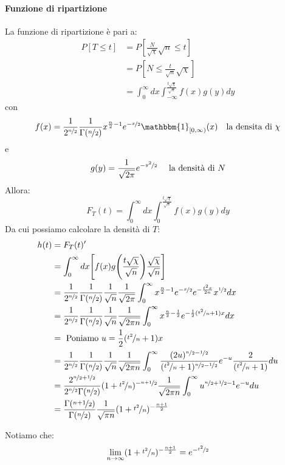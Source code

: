 \documentclass[12pt]{report}
\begin{document}
	 \paragraph{Funzione di ripartizione}
	 La funzione di ripartizione è pari a:
	 \begin{align*}
	 	P[T \leq t] &= P[\frac{N}{\sqrt{\chi}}\sqrt{n} \leq t] \\
	 	&= P[N \leq \frac{t}{\sqrt{n}}\sqrt{\chi}] \\
	 	&= \int_{0}^{\infty}dx\int_{-\infty}^{\frac{t\sqrt{\chi}}{\sqrt{n}}}f(x)g(y)dy
	 \end{align*}
	 con
	 \[
	 f(x) = \frac{1}{2^{\nicefrac{n}{2}}}\frac{1}{\Gamma(\nicefrac{n}{2})}x^{\frac{n}{2} - 1}e^{-\nicefrac{x}{2}}\mathbbm{1}_{[0, \infty)}(x) \quad \text{la densita di }\chi
	 \]
	 e
	 \[
	 g(y) = \frac{1}{\sqrt{2\pi}}e^{-\nicefrac{y^2}{2}} \quad \text{ la densità di }N
	 \]
	 Allora:
	\[
	F_T(t) = \int_{0}^{\infty}dx\int_{0}^{\frac{t\sqrt{\chi}}{\sqrt{n}}}f(x)g(y)dy
	\]
	Da cui possiamo calcolare la densità di $T$:
	\begin{align*}
		h(t) &= F_T(t)' \\
		&= \int_{0}^{\infty}dx\Bigg[f(x)g\Bigg(\frac{t\sqrt{\chi}}{\sqrt{n}}\Bigg)\frac{\sqrt{\chi}}{\sqrt{n}}\Bigg] \\
		&=\frac{1}{2^{\nicefrac{n}{2}}}\frac{1}{\Gamma(\nicefrac{n}{2})}\frac{1}{\sqrt{n}}\frac{1}{\sqrt{2\pi}}\int_{0}^{\infty}x^{\frac{n}{2} - 1}e^{-\nicefrac{x}{2}}e^{-\frac{t^2x}{2n}}x^{\nicefrac{1}{2}}dx \\
		&= \frac{1}{2^{\nicefrac{n}{2}}}\frac{1}{\Gamma(\nicefrac{n}{2})}\frac{1}{\sqrt{n}}\frac{1}{\sqrt{2\pi n}}\int_{0}^{\infty}x^{\frac{n}{2} - \frac{1}{2}}e^{-\frac{1}{2}(\nicefrac{t^2}{n} + 1)x}dx \\
		&= \text{ Poniamo } u = \frac{1}{2}(\nicefrac{t^2}{n} + 1)x \\
		&= \frac{1}{2^{\nicefrac{n}{2}}}\frac{1}{\Gamma(\nicefrac{n}{2})}\frac{1}{\sqrt{n}}\frac{1}{\sqrt{2\pi n}}\int_{0}^{\infty}\frac{(2u)^{\nicefrac{n}{2} - \nicefrac{1}{2}}}{(\nicefrac{t^2}{n} + 1)^{\nicefrac{n}{2} - \nicefrac{1}{2}}}e^{-u}\frac{2}{(\nicefrac{t^2}{n} + 1)}du \\
		&= \frac{2^{\nicefrac{n}{2} + \nicefrac{1}{2}}}{2^{\nicefrac{n}{2}}\Gamma(\nicefrac{n}{2})}(1 + \nicefrac{t^2}{n})^{-\nicefrac{n+1}{2}}\frac{1}{\sqrt{2\pi n}}\int_{0}^{\infty}u^{\nicefrac{n}{2} + \nicefrac{1}{2} - 1}e^{-u}du \\
		&= \frac{\Gamma(\nicefrac{n+1}{2})}{\Gamma(\nicefrac{n}{2})}\frac{1}{\sqrt{\pi n}}(1 + \nicefrac{t^2}{n})^{-\frac{n+1}{2}}
	\end{align*}
	\begin{note}{}{}
		Notiamo che:
		\[
		\lim\limits_{n\to\infty}(1 + \nicefrac{t^2}{n})^{-\frac{n+1}{2}} = e^{-\nicefrac{t^2}{2}}
		\]
	\end{note}
\end{document}
